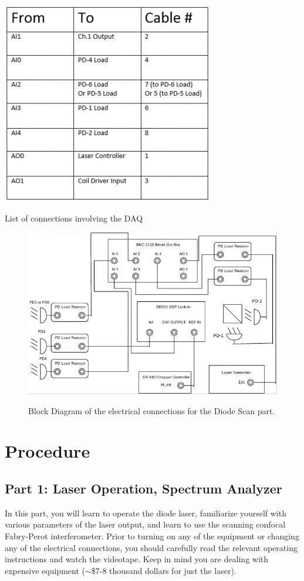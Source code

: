 \documentclass{../lab}
\begin{document}
\begin{table}[h]
    \centering
    \href{http://experimentationlab.berkeley.edu/sites/default/files/images/350px-Connectionchart.jpg}{\includegraphics[width=0.5\linewidth]{images/350px-Connectionchart.jpg}}
    \caption{List of connections involving the DAQ}
    \label{table:ListOfConnectionsInvolvingDAQ}
\end{table}

\begin{figure}[h]
    \centering
    \href{http://experimentationlab.berkeley.edu/sites/default/files/images/MNOfigure2.jpg}{\includegraphics[width=0.5\linewidth]{images/MNOfigure2.jpg}}
    \caption{Block Diagram of the electrical connections for the Diode Scan part.}
    \label{fig:BlockDiagramOfElectricalConnections}
\end{figure}

\section{Procedure}

\subsection{Part 1: Laser Operation, Spectrum Analyzer}

In this part, you will learn to operate the diode laser, familiarize yourself with various parameters of the laser output, and learn to use the scanning confocal Fabry-Perot interferometer. Prior to turning on any of the equipment or changing any of the electrical connections, you should carefully read the relevant operating instructions and watch the videotape. Keep in mind you are dealing with expensive equipment ($\sim$\$7-8 thousand dollars for just the laser).
\end{document}
